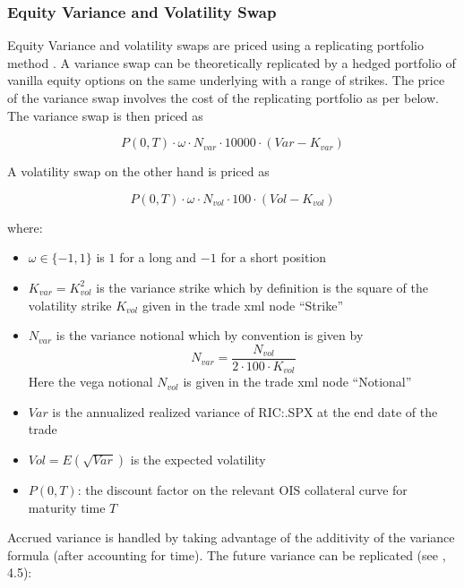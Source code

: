 \subsubsection{Equity Variance and Volatility Swap}
\label{pricing:eq_varianceswap}

Equity Variance and volatility swaps are priced using a replicating portfolio method \cite{Variance_Swaps_JP_Morgan}. A
variance swap can be theoretically replicated by a hedged portfolio of vanilla equity options on the same underlying
with a range of strikes. The price of the variance swap involves the cost of the replicating portfolio as per below. The
variance swap is then priced as

\begin{equation}\label{eq_varianceswap_payoff}
P(0,T) \cdot \omega \cdot N_{var} \cdot 10000 \cdot ( Var - K_{var}  )
\end{equation}

A volatility swap on the other hand is priced as

\begin{equation}
P(0,T) \cdot \omega \cdot N_{vol} \cdot 100 \cdot ( Vol - K_{vol} )
\end{equation}

where:

\begin{itemize}
\item $\omega \in \{-1,1\}$ is $1$ for a long and $-1$ for a short position
\item $K_{var} = K_{vol}^2$ is the variance strike which by definition is the square of the volatility strike $K_{vol}$
  given in the trade xml node ``Strike''
\item $N_{var}$ is the variance notional which by convention is given by
  $$N_{var} = \frac{N_{vol}}{2 \cdot 100 \cdot K_{vol}}$$
  Here the vega notional $N_{vol}$ is given in the trade xml node ``Notional''
\item $Var$ is the annualized realized variance of RIC:.SPX at the end date of the trade
\item $Vol = E( \sqrt{Var} )$ is the expected volatility
\item $P(0,T)$: the discount factor on the relevant OIS collateral curve for maturity time $T$
\end{itemize}

Accrued variance is handled by taking advantage of the additivity of the variance formula (after accounting for
time). The future variance can be replicated (see \cite{Variance_Swaps_JP_Morgan}, 4.5):

